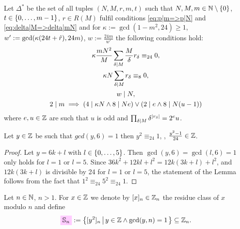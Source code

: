 \documentclass{article}
\begin{document}
\begin{Definition}\cite[Def.~35]{Radu:RamanujanKolberg:2015}
  \label{def:condition-co-eta-quotient-gamma0}
  Let $\Delta^*$ be the set of all tuples $(N, M, r, m, t)$ such that
  $N, M, m \in \mathbb{N}\setminus\left\{0\right\}$,
  $t \in \left\{0,\ldots,m-1\right\}$,
  $r \in R(M)$
  fulfil conditions \eqref{eq:p|m=>p|N} and \eqref{eq:delta|M=>delta|mN}
  and for
  $\kappa:=\gcd(1-m^2, 24)\ge1$,
  $w' := \gcd(\kappa(24t + \hat{r}),24m)$,
  $w := \frac{24m}{w'}$
  the following conditions hold:
  \begin{gather}
  \kappa \frac{m N^2}{M} \sum_{\delta \mid M} \frac{M}{\delta}
    r_\delta \equiv_{24} 0,\label{eq:rv24}\\
  \kappa N \sum_{\delta \mid M} r_\delta \equiv_8 0,\label{eq:sum-r}\\
  w \mid N,\label{eq:w|N}\\
  2 \mid m \implies (4 \mid \kappa N \land 8 \mid N e)
  \lor
  (2 \mid e \land 8 \mid N(u-1))\label{eq:even-m}
\end{gather}
where $e, u\in\mathbb{Z}$ are such that $u$ is odd and
$\prod_{\delta \mid M} \delta^{\lvert r_\delta\rvert}=2^e u$.
\end{Definition}

\begin{Lemma}\label{thm:y^2-1}
  Let $y\in \mathbb{Z}$ be such that $gcd(y, 6)=1$ then
  $y^2 \equiv_{24} 1$, \ie, $ \frac{y^2-1}{24} \in \mathbb{Z}$.
\end{Lemma}
\begin{proof}
  Let $y = 6k + l$ with $l \in \left\{0,\ldots,5\right\}$. Then
  $\gcd(y, 6)=\gcd(l,6)=1$ only holds for $l=1$ or $l=5$.
  Since $36 k^2 + 12 k l + l^2 = 12k(3k+l) + l^2$, and $12k(3k+l)$ is
  divisible by 24 for $l=1$ or $l=5$, the statement of the Lemma
  follows from the fact that $1^2\equiv_{24} 5^2 \equiv_{24} 1$.
\end{proof}

\begin{Definition}\cite[Def.~40]{Radu:RamanujanKolberg:2015}
  Let $n \in \mathbb{N}$, $n>1$. For $x \in \mathbb{Z}$ we denote by
  $[x]_n\in \mathbb{Z}_n$ the residue class of $x$ modulo $n$ and define
  \begin{gather*}
    \defineNotation[S-n]{\setS_{n}}
    :=
    \SetDef{[y^2]_n}{y \in \setZ \land \gcd(y, n)=1}
    \subseteq
    \setZ_n.
  \end{gather*}
\end{Definition}
\end{document}
